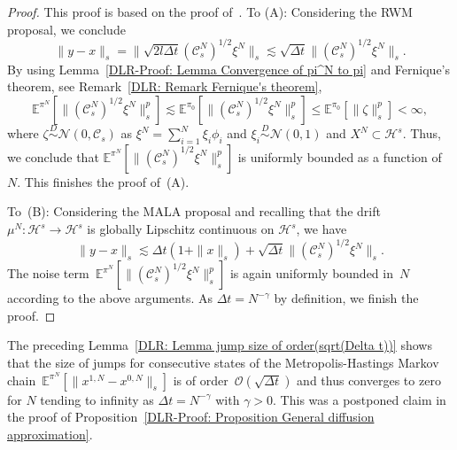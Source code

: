 \begin{proof}
  This proof is based on the proof of~\autocite[Lemma 4.2]{Pillai2012}. To (A): Considering the RWM proposal, we conclude
   \begin{equation*}
      \| y - x \|_s  = \| \sqrt{2l \Delta t} (\mathcal{C}_s^N)^{1/2} \xi^N \|_s  \lesssim \sqrt{\Delta t} \|  (\mathcal{C}_s^N)^{1/2} \xi^N \|_s.
   \end{equation*}
   By using Lemma~\ref{DLR-Proof: Lemma Convergence of pi^N to pi} and Fernique's theorem, see Remark~\ref{DLR: Remark Fernique's theorem},
   \begin{equation*}
     \mathbb{E}^{\pi^N}[\|  (\mathcal{C}_s^N)^{1/2} \xi^N \|_s^p] \lesssim \mathbb{E}^{\pi_0}[\|  (\mathcal{C}_s^N)^{1/2} \xi^N \|_s^p] \leq \mathbb{E}^{\pi_0} [\|  \zeta \|_s^p] < \infty,
   \end{equation*}
   where $\zeta \stackrel{D}{\sim} \mathcal{N}(0, \mathcal{C}_s)$ as $\xi^{N} = \sum_{i=1}^{N} \xi_i \phi_i$ and $\xi_i \stackrel{D}{\sim} \mathcal{N}(0,1)$ and $X^N \subset \mathcal{H}^s$. Thus, we conclude that $\mathbb{E}^{\pi^N}[\|  (\mathcal{C}_s^N)^{1/2} \xi^N \|_s^p]$ is uniformly bounded as a function of $N$. This finishes the proof of~(A).
   
   To~(B): Considering the MALA proposal and recalling that the drift~$\mu^N: \mathcal{H}^s \to \mathcal{H}^s$ is globally Lipschitz continuous on $\mathcal{H}^s$, we have
   \begin{equation*}
     \| y - x \|_s    \lesssim \Delta t ( 1 + \| x \|_s) + \sqrt{\Delta t} \|  (\mathcal{C}_s^N)^{1/2} \xi^N \|_s.
   \end{equation*}
   The noise term~$\mathbb{E}^{\pi^N}[\|  (\mathcal{C}_s^N)^{1/2} \xi^N \|_s^p]$ is again uniformly bounded in~$N$ according to the above arguments. As $\Delta t = N^{-\gamma}$ by definition, we finish the proof.

\end{proof}

\begin{rem}
  The preceding Lemma~\ref{DLR: Lemma jump size of order(sqrt(Delta t))} shows that the size of jumps for consecutive states of the Metropolis-Hastings Markov chain~$\mathbb{E}^{\pi^N} [ \| x^{1,N} -x^{0,N} \|_s ]$ is of order~$\mathcal{O}(\sqrt{\Delta t})$ and thus converges to zero for $N$ tending to infinity as $\Delta t = N^{-\gamma}$ with $\gamma >0$. This was a postponed claim in the proof of Proposition~\ref{DLR-Proof: Proposition General diffusion approximation}.
\end{rem}



